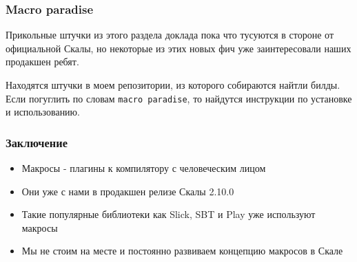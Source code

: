 \documentclass[svgnames,hyperref={bookmarks=false}]{beamer}
\begin{document}
\begin{frame}[fragile]
\frametitle{Macro paradise}

Прикольные штучки из этого раздела доклада пока что тусуются в стороне от официальной Скалы,
но некоторые из этих новых фич уже заинтересовали наших продакшен ребят.

Находятся штучки в моем репозитории, из которого собираются найтли билды.
Если погуглить по словам \texttt{macro paradise}, то найдутся инструкции по установке и использованию.
\end{frame}

\begin{frame}[fragile]
\frametitle{}

\vskip40pt
\begin{center}
\end{center}
\end{frame}

\begin{frame}[fragile]
\frametitle{Заключение}
\begin{itemize}
\item Макросы - плагины к компилятору с человеческим лицом
\item Они уже с нами в продакшен релизе Скалы 2.10.0
\item Такие популярные библиотеки как Slick, SBT и Play уже используют макросы
\item Мы не стоим на месте и постоянно развиваем концепцию макросов в Скале
\end{itemize}
\end{frame}

\begin{frame}[fragile]
\frametitle{}

\vskip40pt
\begin{center}
\\
\end{center}
\end{frame}
\end{document}
